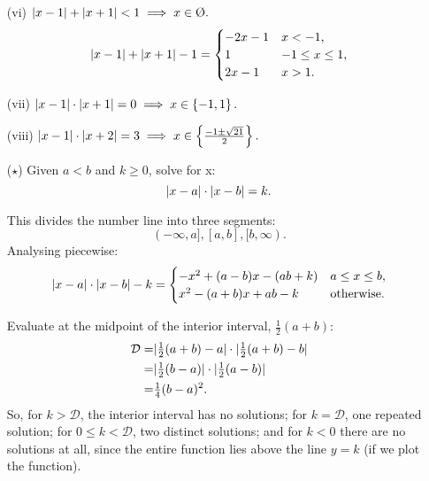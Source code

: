 \documentclass[11pt]{article}
\begin{document}
\begin{enumerate}
    \item[(vi)] $
              \abs{x - 1} + \abs{x + 1} < 1
              \implies x \in \text{\O}.
          $
          \[
              \lvert x - 1\rvert + \lvert x + 1\rvert - 1 =
              \begin{cases}
                  -2x - 1 & x < -1,           \\
                  1       & -1 \leq x \leq 1, \\
                  2x -1   & x > 1.            \\
              \end{cases}
          \]

    \item[(vii)] $
              \lvert x - 1\rvert \cdot \lvert x + 1\rvert = 0
              \implies x \in \left\{-1, 1\right\}.
          $


    \item[(viii)] $
              \lvert x - 1\rvert \cdot \lvert x + 2\rvert = 3
              \implies x \in \left\{
                  \frac{-1 \pm \sqrt{21}}{2}
              \right\}.
          $

    \item[($\star$)] Given $a < b$ and $k \geq 0$, solve for x:
          \[
              \lvert x - a\rvert \cdot \lvert x - b\rvert = k.
          \]

          This divides the number line into three segments:
          \[
              (-\infty, a], [a, b], [b, \infty).
          \]
          Analysing piecewise:
          \[
              \lvert x - a\rvert \cdot \lvert x - b\rvert - k =
              \begin{cases}
                  -x^2 + (a - b)x - (ab + k) & a \leq x \leq b,  \\
                  x^2 - (a + b)x + ab - k    & \text{otherwise}. \\
              \end{cases}
          \]


          Evaluate at the midpoint of the interior interval, $\tfrac{1}{2}(a + b)$:
          \[
              \begin{aligned}
                  \mathcal{D} = & \lvert\tfrac{1}{2}(a + b) - a\rvert \cdot \lvert\tfrac{1}{2}(a + b) - b\rvert \\
                  =             & \lvert\tfrac{1}{2}(b - a)\rvert \cdot \lvert\tfrac{1}{2}(a - b)\rvert         \\
                  =             & \tfrac{1}{4} (b - a)^2.
              \end{aligned}
          \]
          So, for $k > \mathcal{D}$, the interior interval has no solutions; for $k = \mathcal{D}$,
          one repeated solution; for $0 \leq k < \mathcal{D}$, two distinct solutions; and for $k <
              0$ there are no solutions at all, since the entire function lies above the line $y = k$
          (if we plot the function).


\end{enumerate}
\end{document}

